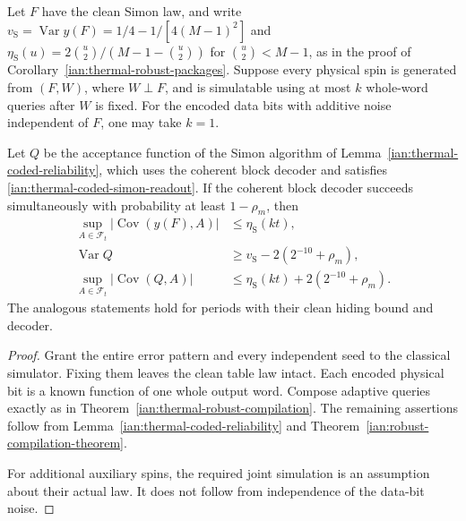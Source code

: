 \begin{proposition}
\label{ian:thermal-coded-hiding}
Let \(F\) have the clean Simon law, and write
\(v_{\mathrm S}=\operatorname{Var}y(F)=1/4-1/[4(M-1)^2]\) and
\(\eta_{\mathrm S}(u)=2\binom u2/(M-1-\binom u2)\) for
\(\binom u2<M-1\), as in the proof of
Corollary~\ref{ian:thermal-robust-packages}. Suppose every physical
spin is generated from \((F,W)\), where \(W\perp F\), and is
simulatable using at most \(k\) whole-word queries after \(W\) is
fixed. For the encoded data bits with additive noise independent of
\(F\), one may take \(k=1\).

Let \(Q\) be the acceptance function of the Simon algorithm of
Lemma~\ref{ian:thermal-coded-reliability}, which uses the coherent
block decoder and satisfies \eqref{ian:thermal-coded-simon-readout}.
If the coherent block decoder succeeds simultaneously with
probability at least \(1-\rho_m\), then
\[
 \begin{aligned}
 \sup_{A\in\mathcal F_t}
      |\operatorname{Cov}(y(F),A)|
     &\le\eta_{\mathrm S}(kt),\\
 \operatorname{Var}Q
     &\ge v_{\mathrm S}-2(2^{-10}+\rho_m),\\
 \sup_{A\in\mathcal F_t}|\operatorname{Cov}(Q,A)|
     &\le\eta_{\mathrm S}(kt)+2(2^{-10}+\rho_m).
 \end{aligned}
 \tag{38.17}
\]
The analogous statements hold for periods with their clean hiding
bound and decoder.
\end{proposition}

\begin{proof}
Grant the entire error pattern and every independent seed to the
classical simulator. Fixing them leaves the clean table law intact.
Each encoded physical bit is a known function of one whole output
word. Compose adaptive queries exactly as in
Theorem~\ref{ian:thermal-robust-compilation}.
The remaining assertions follow from
Lemma~\ref{ian:thermal-coded-reliability} and
Theorem~\ref{ian:robust-compilation-theorem}.

For additional auxiliary spins, the required joint simulation is
an assumption about their actual law. It does not follow from
independence of the data-bit noise.
\end{proof}

